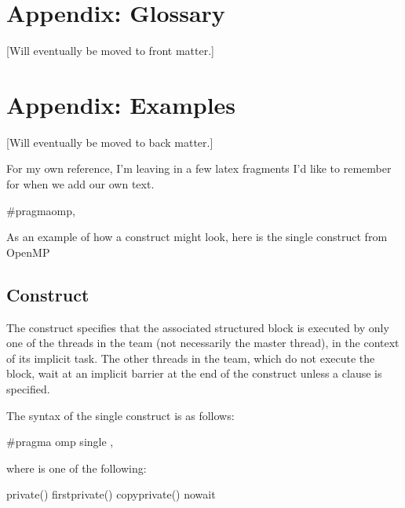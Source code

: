 \section{Appendix: Glossary}
  [Will eventually be moved to front matter.]

\section{Appendix: Examples}
  [Will eventually be moved to back matter.]


For my own reference, I'm leaving in a few latex fragments I'd like to remember for when we add our own text.


\begin{boxedcode}
\#pragma\plc{ }omp\plc{ directive-name [clause[ [},\plc{] clause] ... ] new-line}
\end{boxedcode}

As an example of how a construct might look, here is the single construct from OpenMP

\subsection{ Construct}
\label{subsec:single Construct}
\summary
The  construct specifies that the associated structured block is executed by only 
one of the threads in the team (not necessarily the master thread), in the context of its 
implicit task. The other threads in the team, which do not execute the block, wait at an 
implicit barrier at the end of the  construct unless a  clause is specified.

\parbox{\linewidth}{%
\syntax
\ccppspecificstart}
The syntax of the single construct is as follows:

\begin{boxedcode}
\#pragma omp single \plc{[clause[ [},\plc{] clause] ... ] new-line}
\end{boxedcode}

\begin{samepage}
where  is one of the following:

\begin{indentedcodelist}
private()
firstprivate()
copyprivate()
nowait
\end{indentedcodelist}
\ccppspecificend
\end{samepage}


